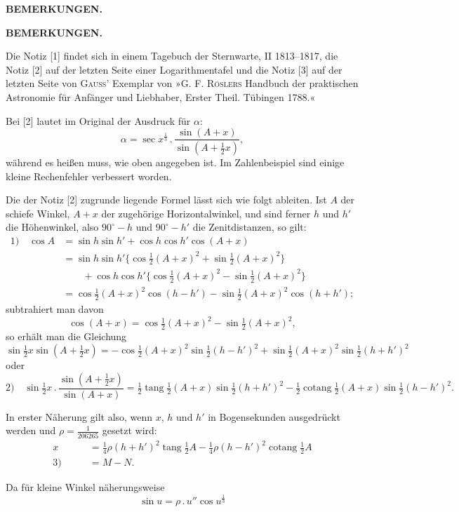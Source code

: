 \par\clearpage
\noindent{}\hfill{\small\textbf{BEMERKUNGEN.}}\hfill\null\par\bigskip
\begingroup\small
\begin{center}\vspace{2cm}\textbf{BEMERKUNGEN.}\end{center}
\par\noindent\hspace*{\parindent}Die Notiz [1] findet sich in einem Tagebuch der Sternwarte, II 1813--1817, die Notiz [2] auf der letzten Seite einer Logarithmentafel und die Notiz [3] auf der letzten Seite von \textsc{Gauss}' Exemplar von »G. F. \textsc{Röslers} Handbuch der praktischen Astronomie für Anfänger und Liebhaber, Erster Theil. Tübingen 1788.«
\par\noindent\hspace*{\parindent}Bei [2] lautet im Original der Ausdruck für $\alpha$:
\[
\alpha=\sec x^{\frac13}\,.\,\frac{\sin(A+x)}{\sin(A+\frac12x)},
\]
\noindent während es heißen muss, wie oben angegeben ist. Im Zahlenbeispiel sind einige kleine Rechenfehler verbessert worden.
\par\noindent\hspace*{\parindent}Die der Notiz [2] zugrunde liegende Formel lässt sich wie folgt ableiten. Ist $A$ der schiefe Winkel, $A+x$ der zugehörige Horizontalwinkel, und sind ferner $h$ und $h'$ die Höhenwinkel, also $90^\circ-h$ und $90^\circ-h'$ die Zenitdistanzen, so gilt:
\[
\begin{aligned}
\text{1)}\quad\cos A&=\sin h\sin h'+\cos h\cos h'\cos(A+x)\\
&=\sin h\sin h'\{\cos\tfrac12(A+x)^2+\sin\tfrac12(A+x)^2\}\\
&\qquad+\cos h\cos h'\{\cos\tfrac12(A+x)^2-\sin\tfrac12(A+x)^2\}\\
&=\cos\tfrac12(A+x)^2\cos(h-h')-\sin\tfrac12(A+x)^2\cos(h+h');
\end{aligned}
\]
\noindent subtrahiert man davon
\[
\cos(A+x)=\cos\tfrac12(A+x)^2-\sin\tfrac12(A+x)^2,
\]
\noindent so erhält man die Gleichung
\[
\sin\tfrac12x\sin(A+\tfrac12x)=-\cos\tfrac12(A+x)^2\sin\tfrac12(h-h')^2+\sin\tfrac12(A+x)^2\sin\tfrac12(h+h')^2
\]
\noindent oder
\[
\text{2)}\quad\sin\tfrac12x\,.\,\frac{\sin(A+\frac12x)}{\sin(A+x)}
=\tfrac12\operatorname{tang}\tfrac12(A+x)\sin\tfrac12(h+h')^2-\tfrac12\operatorname{cotang}\tfrac12(A+x)\sin\tfrac12(h-h')^2.
\]
\par\noindent\hspace*{\parindent}In erster Näherung gilt also, wenn $x$, $h$ und $h'$ in Bogensekunden ausgedrückt werden und $\rho=\frac1{206265}$ gesetzt wird:
\[
\begin{aligned}
x&=\tfrac14\rho(h+h')^2\operatorname{tang}\tfrac12A-\tfrac14\rho(h-h')^2\operatorname{cotang}\tfrac12A\\
\text{3)}\qquad&=M-N.
\end{aligned}
\]
\par\noindent\hspace*{\parindent}Da für kleine Winkel näherungsweise
\[
\sin u=\rho\,.\,u''\cos u^{\frac13}
\]
\par\endgroup


